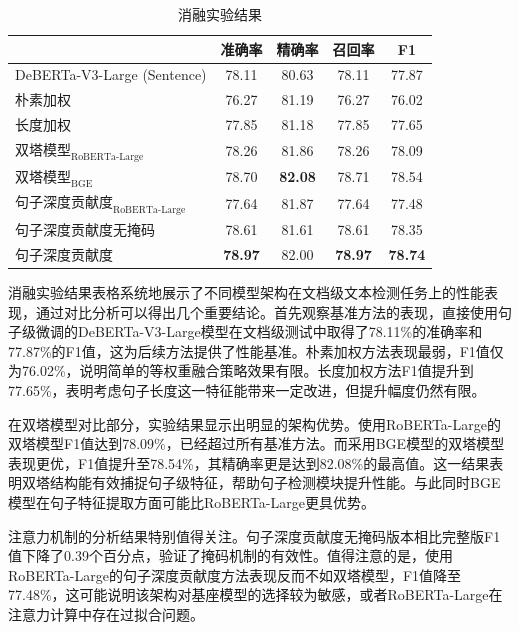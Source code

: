 \begin{table}[htbp]
\centering
\caption{消融实验结果}
\label{tab:ablative-result}
\begin{tabular}{l|cccc}
\toprule
                           & \textbf{准确率}   & \textbf{精确率}   & \textbf{召回率}   & \textbf{F1}    \\ \midrule
DeBERTa-V3-Large \cite{he2023debertav3improvingdebertausing} (Sentence) & 78.11          & 80.63          & 78.11          & 77.87          \\
朴素加权                        & 76.27          & 81.19          & 76.27          & 76.02          \\
长度加权                        & 77.85          & 81.18          & 77.85          & 77.65          \\ \midrule
$\text{双塔模型}_\text{RoBERTa-Large}$ & 78.26          & 81.86          & 78.26          & 78.09          \\
$\text{双塔模型}_\text{BGE}$          & 78.70          & \textbf{82.08} & 78.71          & 78.54          \\
$\text{句子深度贡献度}_\text{RoBERTa-Large}$ & 77.64          & 81.87          & 77.64          & 77.48          \\
句子深度贡献度无掩码            & 78.61          & 81.61          & 78.61          & 78.35          \\ \midrule
句子深度贡献度                  & \textbf{78.97} & 82.00          & \textbf{78.97} & \textbf{78.74} \\ \bottomrule
\end{tabular}
\end{table}

消融实验结果表格系统地展示了不同模型架构在文档级文本检测任务上的性能表现，通过对比分析可以得出几个重要结论。首先观察基准方法的表现，直接使用句子级微调的DeBERTa-V3-Large模型在文档级测试中取得了78.11\%的准确率和77.87\%的F1值，这为后续方法提供了性能基准。朴素加权方法表现最弱，F1值仅为76.02\%，说明简单的等权重融合策略效果有限。长度加权方法F1值提升到77.65\%，表明考虑句子长度这一特征能带来一定改进，但提升幅度仍然有限。

在双塔模型对比部分，实验结果显示出明显的架构优势。使用RoBERTa-Large的双塔模型F1值达到78.09\%，已经超过所有基准方法。而采用BGE模型的双塔模型表现更优，F1值提升至78.54\%，其精确率更是达到82.08\%的最高值。这一结果表明双塔结构能有效捕捉句子级特征，帮助句子检测模块提升性能。与此同时BGE模型在句子特征提取方面可能比RoBERTa-Large更具优势。

注意力机制的分析结果特别值得关注。句子深度贡献度无掩码版本相比完整版F1值下降了0.39个百分点，验证了掩码机制的有效性。值得注意的是，使用RoBERTa-Large的句子深度贡献度方法表现反而不如双塔模型，F1值降至77.48\%，这可能说明该架构对基座模型的选择较为敏感，或者RoBERTa-Large在注意力计算中存在过拟合问题。

